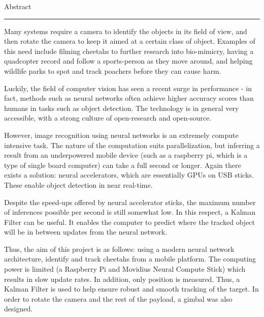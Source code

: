 {\Large Abstract}\\
\hrule

Many systems require a camera to identify the objects in its field of view, and then rotate the camera to keep it aimed at a certain class of object. Examples of this need include filming cheetahs to further research into bio-mimicry, having a quadcopter record and follow a sports-person as they move around, and helping wildlife parks to spot and track poachers before they can cause harm.

Luckily, the field of computer vision has seen a recent surge in performance - in fact, methods such as neural networks often achieve higher accuracy scores than humans in tasks such as object detection. The technology is in general very accessible, with a strong culture of open-research and open-source.

However, image recognition using neural networks is an extremely compute intensive task. The nature of the computation suits parallelization, but inferring a result from an underpowered mobile device (such as a raspberry pi, which is a type of single board computer) can take a full second or longer. Again there exists a solution: neural accelerators, which are essentially GPUs on USB sticks. These enable object detection in near real-time.

Despite the speed-ups offered by neural accelerator sticks, the maximum number of inferences possible per second is still somewhat low. In this respect, a Kalman Filter can be useful. It enables the computer to predict where the tracked object will be in between updates from the neural network.

Thus, the aim of this project is as follows: using a modern neural network architecture, identify and track cheetahs from a mobile platform. The computing power is limited (a Raspberry Pi and Movidius Neural Compute Stick) which results in slow update rates. In addition, only position is measured. Thus, a Kalman Filter is used to help ensure robust and smooth tracking of the target. In order to rotate the camera and the rest of the payload, a gimbal was also designed.

\newpage
